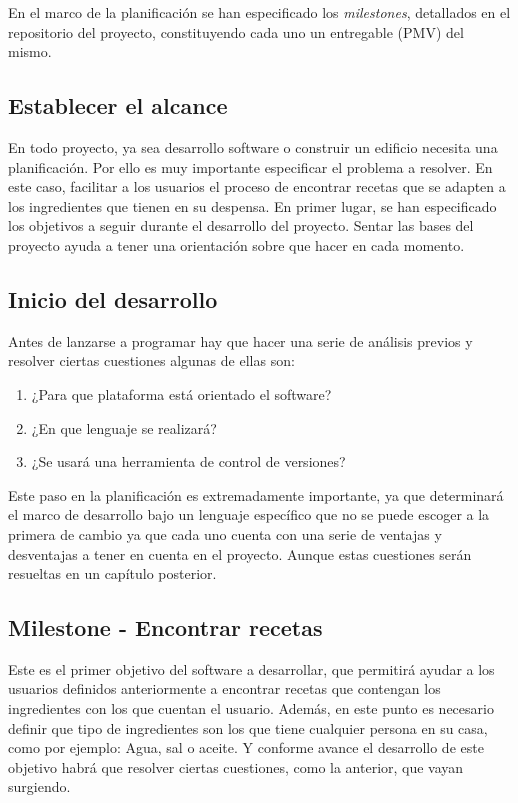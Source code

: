 En el marco de la planificación se han especificado los \emph{milestones}, detallados en el repositorio del proyecto, constituyendo cada uno un entregable (PMV) del mismo.

\subsection{Establecer el alcance}
En todo proyecto, ya sea desarrollo software o construir un edificio necesita una planificación. Por ello es muy importante especificar el problema a resolver. En este caso, facilitar a los usuarios el proceso de encontrar recetas que se adapten a los ingredientes que tienen en su despensa. En primer lugar, se han especificado los objetivos a seguir durante el desarrollo del proyecto. Sentar las bases del proyecto ayuda a tener una orientación sobre que hacer en cada momento. 

\subsection{Inicio del desarrollo}
Antes de lanzarse a programar hay que hacer una serie de análisis previos y resolver ciertas cuestiones algunas de ellas son:
\begin{enumerate}
    \item ¿Para que plataforma está orientado el software?
    \item ¿En que lenguaje se realizará?
    \item ¿Se usará una herramienta de control de versiones?
\end{enumerate}
Este paso en la planificación es extremadamente importante, ya que determinará el marco de desarrollo bajo un lenguaje específico que no se puede escoger a la primera de cambio ya que cada uno cuenta con una serie de ventajas y desventajas a tener en cuenta en el proyecto. Aunque estas cuestiones serán resueltas en un capítulo posterior. 

\subsection{Milestone - Encontrar recetas}
Este es el primer objetivo del software a desarrollar, que permitirá ayudar a los usuarios definidos anteriormente a encontrar recetas que contengan los ingredientes con los que cuentan el usuario. Además, en este punto es necesario definir que tipo de ingredientes son los que tiene cualquier persona en su casa, como por ejemplo: Agua, sal o aceite. Y conforme avance el desarrollo de este objetivo habrá que resolver ciertas cuestiones, como la anterior, que vayan surgiendo. 

